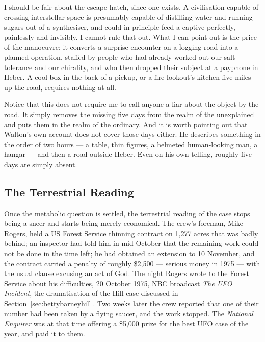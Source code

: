 I should be fair about the escape hatch, since one exists. A civilisation capable of crossing
interstellar space is presumably capable of distilling water and running sugars out of a
synthesiser, and could in principle feed a captive perfectly, painlessly and invisibly. I
cannot rule that out. What I can point out is the price of the manoeuvre: it converts a
surprise encounter on a logging road into a planned operation, staffed by people who had
already worked out our salt tolerance and our chirality, and who then dropped their subject at
a payphone in Heber.  A cool box in the back of a pickup, or a
fire lookout's kitchen five miles up the road, requires nothing at all.

Notice that this does not require me to call anyone a liar about the object by the road. It
simply removes the missing five days from the realm of the unexplained and puts them in the
realm of the ordinary. And it is worth pointing out that Walton's own account does not cover
those days either. He describes something in the order of two hours --- a table, thin figures,
a helmeted human-looking man, a hangar --- and then a road outside Heber. Even on his own
telling, roughly five days are simply absent. 

\subsection{The Terrestrial Reading}

Once the metabolic question is settled, the terrestrial reading of the case stops being a
sneer and starts being merely economical. The crew's foreman, Mike Rogers, held a US Forest
Service thinning contract on 1,277 acres that was badly behind; an inspector had told him in
mid-October that the remaining work could not be done in the time left; he had obtained an
extension to 10 November, and the contract carried a penalty of roughly \$2,500 --- serious
money in 1975 --- with the usual clause excusing an act of God. The night Rogers wrote to the
Forest Service about his difficulties, 20 October 1975, NBC broadcast \emph{The UFO Incident},
the dramatisation of the Hill case discussed in Section~\ref{sec:bettybarneyhill}. Two weeks
later the crew reported that one of their number had been taken by a flying saucer, and the
work stopped. The \emph{National Enquirer} was at that time offering a \$5,000 prize for the
best UFO case of the year, and paid it to them.

